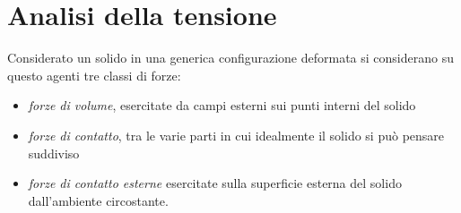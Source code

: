 \chapter{Analisi della tensione}
Considerato un solido in una generica configurazione deformata si considerano su questo
agenti tre classi di forze:
\begin{itemize}
    \item \emph{forze di volume}, esercitate da campi esterni sui punti interni del solido 
    \item \emph{forze di contatto}, tra le varie parti in cui idealmente il solido 
           si può pensare suddiviso
    \item \emph{forze di contatto esterne} esercitate sulla superficie esterna del solido 
           dall'ambiente circostante.
\end{itemize}

